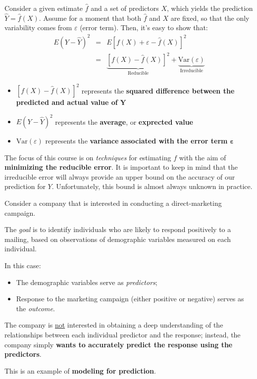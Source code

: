 \documentclass[a4paper]{article}
\newcommand{\definition}[1]{\textcolor{Red3}{\textbf{#1}}\index{#1}}
\newcommand{\Var}{\mathrm{Var}}
\begin{document}
    \noindent
    Consider a given estimate $\hat{f}$ and a set of predictors $X$, which yields the prediction $\hat{Y} = \hat{f}\left(X\right)$. Assume for a moment that both $\hat{f}$ and $X$ are fixed, so that the only variability comes from $\varepsilon$ (error term). Then, it's easy to show that:
    \begin{equation}\label{eq: reducible and irreducible error}
        \begin{array}{rcl}
            E\left(Y - \hat{Y}\right)^{2} &=& E\left[f\left(X\right) + \varepsilon - \hat{f}\left(X\right)\right]^{2} \\ [1em]
                                          &=& \underbrace{\left[f\left(X\right) - \hat{f}\left(X\right)\right]^{2}}_{\text{Reducible}} + \underbrace{\Var\left(\varepsilon\right)}_{\text{Irreducible}}
        \end{array}
    \end{equation}
    \begin{itemize}
        \item $\left[f\left(X\right) - \hat{f}\left(X\right)\right]^{2}$ represents the \textbf{squared difference between the predicted and actual value of} $\bm{Y}$
        
        \item $E\left(Y-\hat{Y}\right)^{2}$ represents the \textbf{average}, or \definition{exprected value}
        
        \item $\Var\left(\varepsilon\right)$ represents the \definition{variance} \textbf{associated with the error term} $\bm{\varepsilon}$
    \end{itemize}
    The focus of this course is on \emph{techniques} for estimating $f$ with the aim of \textbf{minimizing the reducible error}. It is important to keep in mind that the irreducible error will always provide an upper bound on the accuracy of our prediction for $Y$. Unfortunately, this bound is almost always unknown in practice.

    \begin{examplebox}
        Consider a company that is interested in conducting a direct-marketing campaign.

        The \emph{goal} is to identify individuals who are likely to respond positively to a mailing, based on observations of demographic variables measured on each individual.

        In this case:
        \begin{itemize}
            \item The demographic variables serve as \emph{predictors};
            \item Response to the marketing campaign (either positive or negative) serves as the \emph{outcome}.
        \end{itemize}
        The company is \underline{not} interested in obtaining a deep understanding of the relationships between each individual predictor and the response; instead, the company simply \textbf{wants to accurately predict the response using the predictors}.

        This is an example of \textbf{modeling for prediction}.
    \end{examplebox}
\end{document}
